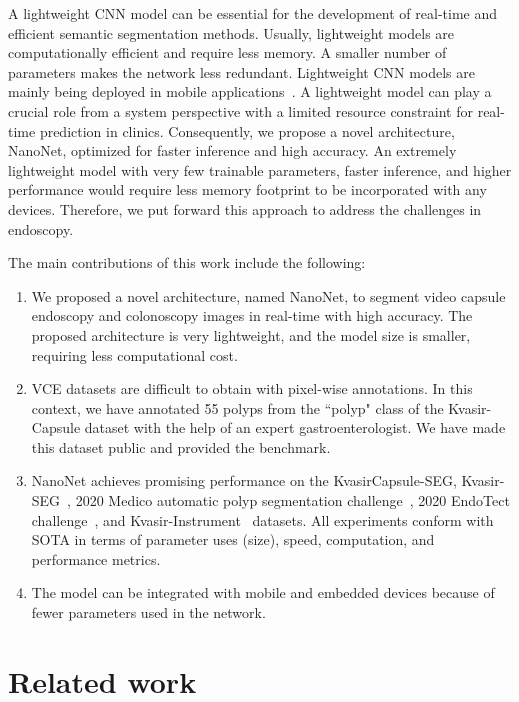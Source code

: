 \documentclass[journal]{IEEEtran}
\begin{document}
A lightweight \ac{CNN} model can be essential for the development of real-time and efficient semantic segmentation methods. Usually, lightweight models are computationally efficient and require less memory. A smaller number of parameters makes the network less redundant. Lightweight \ac{CNN} models are mainly being deployed in mobile applications~\cite{kim2015compression}. A lightweight model can play a crucial role from a system perspective with a limited resource constraint for real-time prediction in clinics.  Consequently, we propose a novel architecture, NanoNet, optimized for faster inference and high accuracy. An extremely lightweight model with very few trainable parameters, faster inference, and higher performance would require less memory footprint to be incorporated with any devices. Therefore, we put forward this approach to address the challenges in endoscopy.  

The main contributions of this work include the following:
\begin{enumerate}
 \item We proposed a novel architecture, named NanoNet, to segment video capsule endoscopy and colonoscopy images in real-time with high accuracy. The proposed architecture is very lightweight, and the model size is smaller, requiring less computational cost. 

\item \ac{VCE} datasets are difficult to obtain with pixel-wise annotations.  In this context, we have annotated 55 polyps from the ``polyp" class of the Kvasir-Capsule dataset with the help of an expert gastroenterologist. We have made this dataset public and provided the benchmark. 

\item NanoNet achieves promising performance on the KvasirCapsule-SEG, Kvasir-SEG~\cite{jha2020kvasir}, 2020 Medico automatic polyp segmentation challenge~\cite{jha2020medico}, 2020 EndoTect challenge~\cite{hicksendotect}, and Kvasir-Instrument~\cite{jha2020kvasirInstrument} datasets. All experiments conform with \ac{SOTA} in terms of parameter uses (size), speed, computation, and performance metrics.   
    
 \item The model can be integrated with mobile and embedded devices because of fewer parameters used in the network. 

\end{enumerate}

\section{Related work}
\label{sec:relatedwork}
\end{document}
